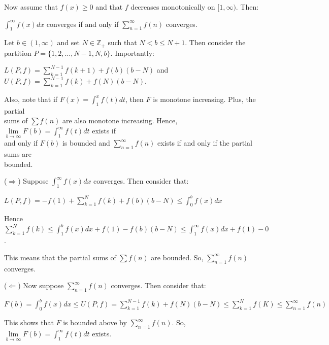 \documentclass{book}
\newcommand{\pracTwo}{
   \color{Orange}%
   \fontsize{12}{14}\selectfont%
}
\newenvironment{myIndent}{%
   \begin{adjustwidth}{2.5em}{0em}%
}{%
   \end{adjustwidth}%
}
\newcommand{\retTwo}{\hfill\bigbreak}
\begin{document}
Now assume that $f(x) \geq 0$ and that $f$ decreases monotonically on $[1, \infty)$. Then:

{\centering $\int_1^\infty f(x)dx$ converges if and only if $\sum\limits_{n=1}^\infty f(n)$ converges. \retTwo\par}

{\begin{myIndent}\pracTwo
   Let $b \in (1, \infty)$ and set $N \in \mathbb{Z}_+$ such that $N < b \leq N + 1$. Then consider the\\ partition $P = \{1, 2, \ldots, N - 1, N, b\}$. Importantly:
   
   {\centering $L(P, f) = \sum\limits_{k=1}^{N-1}f(k+1) + f(b)(b - N)$ and $U(P, f) = \sum\limits_{k=1}^{N-1}f(k) + f(N)(b - N)$.\retTwo\par}

   Also, note that if $F(x) = \int_1^x f(t)dt$, then $F$ is monotone increasing. Plus, the partial\\ [3pt] sums of $\sum f(n)$ are also monotone increasing. Hence, $\lim\limits_{b \rightarrow \infty}F(b) = \int_1^\infty f(t)dt$ exists if\\ [-7pt] and only if $F(b)$ is bounded and $\sum\limits_{n = 1}^\infty f(n)$ exists if and only if the partial sums are\\ bounded.\retTwo

   ($\Longrightarrow$) Suppose $\int_1^\infty f(x)dx$ converges. Then consider that:
   
   {\centering $L(P, f) = -f(1) + \sum\limits_{k=1}^{N} f(k) + f(b)(b - N) \leq \int_0^b f(x)dx$\retTwo\par}

   Hence $\sum\limits_{k=1}^N f(k) \leq \int_1^b f(x)dx + f(1) - f(b)(b - N) \leq \int_1^\infty f(x)dx + f(1) - 0$.\retTwo

   This means that the partial sums of $\sum f(n)$ are bounded. So, $\sum\limits_{n=1}^\infty f(n)$ converges.\retTwo

   ($\Longleftarrow$) Now suppose $\sum\limits_{n=1}^\infty f(n)$ converges. Then consider that:

   {\centering $F(b) = \int_0^b f(x)dx \leq U(P, f) = \sum\limits_{k=1}^{N-1}f(k) + f(N)(b - N) \leq \sum\limits_{k=1}^{N}f(K) \leq \sum\limits_{n=1}^\infty f(n)$\retTwo\par}

   This shows that $F$ is bounded above by $\sum\limits_{n=1}^\infty f(n)$. So, $\lim\limits_{b \rightarrow \infty}F(b) = \int_1^\infty f(t)dt$ exists.
\end{myIndent}}
\end{document}
